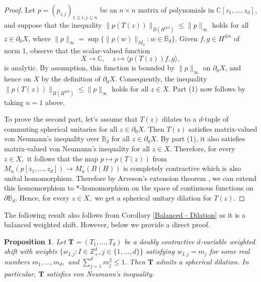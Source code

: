\documentclass[12pt,reqno] {amsart}
\newtheorem{proposition}{Proposition}
\theoremstyle{remark}
\theoremstyle{definition}
\begin{document}
\begin{proof}
Let \( p = (p_{i,j})_{1 \leq i,j \leq n} \) be an \( n \times n \) matrix of polynomials in \( \mathbb{C}[z_1, \dots, z_d] \), and suppose that the inequality $\|p(T(z))\|_{B(H^{\oplus n})} \leq \|p\|_\infty$
holds for all \( z \in \partial_0 X \), where \( \|p\|_\infty = \sup \{ \|p(w)\|_{M_n} : w \in\overline{\mathbb B}_d \} \). 
Given \( f, g \in H^{\oplus n} \) of norm 1, observe that the scalar-valued function
\[
X \to \mathbb{C}, \quad z \mapsto \langle p(T(z))f, g \rangle,
\]
is analytic. By assumption, this function is bounded by \( \|p\|_\infty \) on \( \partial_0 X \), and hence on \( X \) by the definition of \( \partial_0 X \). Consequently, the inequality
$\|p(T(z))\|_{B(H^{\oplus n})} \leq \|p\|_\infty$
holds for all \( z \in X \). Part (1) now follows by taking \( n = 1 \) above.

To prove the second part, let's assume that $T(z)$  dilates to a $d$-tuple of commuting spherical unitaries  for all $z\in \partial _0X$. Then $T(z)$  satisfies matrix-valued von Neumann's inequality over $\mathbb B_d$ for all $z \in \partial_0 X.$ By part (1), it also satisfies matrix-valued von Neumann's inequality for all $z\in X.$ Therefore, for every $z\in X,$ it follows that the map \( p\mapsto p(T(z))\) from $M_n(p[z_1,\dots,z_d])\to M_n(B(H))$ is completely contractive which is also unital homomorphism. Therefore by Arveson's extension theorem 
 \cite[Corollary 7.7]{VP}, 
 we can extend this homomorphism to $*$-homomorphism on the space of continuous functions on $\partial \mathbb B_d.$ Hence, for every $z\in X,$ we get a spherical unitary dilation for $T(z)$. 
 \end{proof}
The following result also follows from Corollary \ref{Balanced - Dilation} as it is a balanced weighted shift. However, below we provide a direct proof.
\begin{proposition}\label{Dilation for X_0}
    Let $\boldsymbol T=(T_1, \ldots, T_d)$ be a doubly contractive $d$-variable weighted shift with weights $\{w_{I,j}: I\in\mathbb{Z}_+^d, j\in\{1,\ldots, d\}\}$ satisfying $w_{I,j}=m_j$ for some real numbers $m_1,\ldots,m_d,$ and $\sum_{j=1}^{d} m_j^2 \leq 1.$
Then $\boldsymbol T$ admits a spherical dilation. In particular, $\boldsymbol T$ satisfies von Neumann’s inequality.
\end{proposition}
\end{document}
